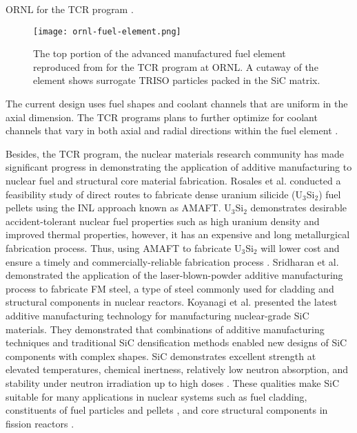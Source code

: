 \gls{ORNL} for the \gls{TCR} program \cite{betzler_transformational_2020}. 
\begin{figure}[]
    \centering
    \texttt{[image: ornl-fuel-element.png]} 
    \caption{The top portion of the advanced manufactured fuel element 
    reproduced from \cite{betzler_transformational_2020} for the \acrfull{TCR} 
    program at \acrfull{ORNL}. A cutaway of the element shows surrogate TRISO 
    particles packed in the SiC matrix.}
    \label{fig:ornl-fuel-element}
\end{figure}
The current design uses fuel shapes and coolant channels that are uniform in the 
axial dimension. 
The \gls{TCR} programs plans to further optimize for coolant channels that vary 
in both axial and radial directions within the fuel element 
\cite{betzler_transformational_2020,sobes_artificial_2020}. 

Besides, the \gls{TCR} program, the nuclear materials research community has made 
significant progress in demonstrating the application of additive manufacturing 
to nuclear fuel and structural core material fabrication. 
Rosales et al. \cite{rosales_characterizing_2019} conducted a feasibility study 
of direct routes to fabricate dense uranium silicide (U$_3$Si$_2$) fuel pellets 
using the \gls{INL} approach known as \gls{AMAFT}. 
U$_3$Si$_2$ demonstrates desirable accident-tolerant nuclear fuel properties 
such as high uranium density and improved thermal properties, however, it has 
an expensive and long metallurgical fabrication process. 
Thus, using \gls{AMAFT} to fabricate U$_3$Si$_2$ will lower cost and ensure a
timely and commercially-reliable fabrication process \cite{rosales_characterizing_2019}. 
Sridharan et al. \cite{sridharan_performance_2019} demonstrated the application of
the laser-blown-powder additive manufacturing process to fabricate \gls{FM} steel, a type of 
steel commonly used for cladding and structural components in nuclear reactors. 
Koyanagi et al. \cite{koyanagi_additive_2020} presented the latest 
additive manufacturing technology for manufacturing nuclear-grade \gls{SiC} materials. 
They demonstrated that combinations of additive manufacturing techniques and 
traditional \gls{SiC} densification methods enabled new designs of \gls{SiC} 
components with complex shapes. 
\gls{SiC} demonstrates excellent strength at elevated temperatures, chemical inertness, 
relatively low neutron absorption, and stability under neutron irradiation up 
to high doses \cite{sauder_ceramic_2014, snead_handbook_2007,koyanagi_additive_2020}. 
These qualities make \gls{SiC} suitable for many applications in nuclear systems 
such as fuel cladding, constituents of fuel particles \cite{snead_handbook_2007} 
and pellets \cite{terrani_progress_2015}, and core structural components in fission 
reactors \cite{sauder_ceramic_2014}. 


